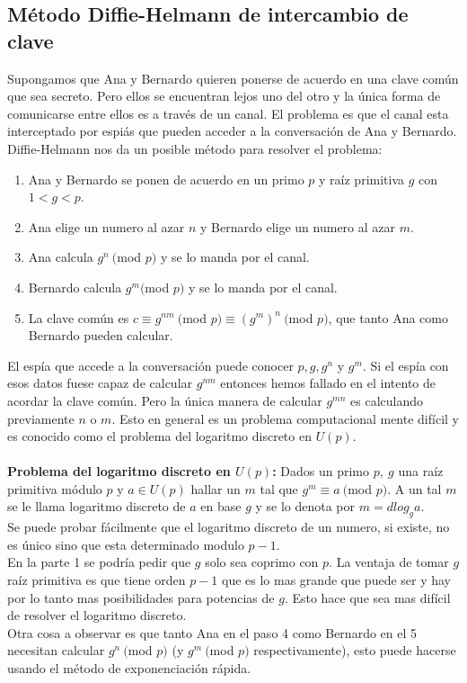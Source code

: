 \documentclass{report}
\begin{document}
\subsection{Método Diffie-Helmann de intercambio de clave}
Supongamos que Ana y Bernardo quieren ponerse de acuerdo en una clave común que sea secreto. Pero ellos se encuentran lejos uno del otro y la única forma de comunicarse entre ellos es a través de un canal. El problema es que el canal esta interceptado por espiás que pueden acceder a la conversación de Ana y Bernardo. Diffie-Helmann nos da un posible método para resolver el problema:
\begin{enumerate}
    \item Ana y Bernardo se ponen de acuerdo en un primo $p$ y raíz primitiva $g$ con $1<g<p$.
    \item Ana elige un numero al azar $n$ y Bernardo elige un numero al azar $m$.
    \item Ana calcula $g^n\ ($mod $p)$ y se lo manda por el canal.
    \item Bernardo calcula $g^m ($mod $p)$ y se lo manda por el canal.
    \item La clave común es $c\equiv g^{nm}\ ($mod $p)\equiv (g^m)^n\ ($mod $p)$, que tanto Ana como Bernardo pueden calcular.
\end{enumerate}
El espía que accede a la conversación puede conocer $p,g,g^n$ y $g^m$. Si el espía con esos datos fuese capaz de calcular $g^{nm}$ entonces hemos fallado en el intento de acordar la clave común. Pero la única manera de calcular $g^{mn}$ es calculando previamente $n$ o $m$. Esto en general es un problema computacional mente difícil y es conocido como el problema del logaritmo discreto en $U(p)$.\\\\
\textbf{Problema del logaritmo discreto en $U(p)$:} Dados un primo $p,\ g$ una raíz primitiva módulo $p$ y $a\in U(p)$ hallar un $m$ tal que $g^m\equiv a\ ($mod $p)$. A un tal $m$ se le llama logaritmo discreto de $a$ en base $g$ y se lo denota por $m=dlog_ga$.\\Se puede probar fácilmente que el logaritmo discreto de un numero, si existe, no es único sino que esta determinado modulo $p-1$.\\En la parte 1 se podría pedir que $g$ solo sea coprimo con $p$. La ventaja de tomar $g$ raíz primitiva es que tiene orden $p-1$ que es lo mas grande que puede ser y hay por lo tanto mas posibilidades para potencias de $g$. Esto hace que sea mas difícil de resolver el logaritmo discreto.\\Otra cosa a observar es que tanto Ana en el paso 4 como Bernardo en el 5 necesitan calcular $g^n\ ($mod $p)$ (y $g^m\ ($mod $p)$ respectivamente), esto puede hacerse usando el método de exponenciación rápida.
\end{document}
